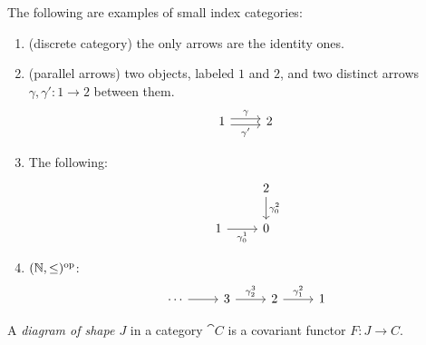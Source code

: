 \documentclass[12pt]{article}
\begin{document}
\begin{example}
	The following are examples of small index categories:
	\begin{enumerate}
		\item (discrete category) the only arrows are the identity ones.
		\item (parallel arrows) two objects, labeled $1$ and $2$, and two distinct arrows $\gamma, \gamma':1\to 2$ between them.
			\begin{equation*}
\begin{tikzcd}
1 \arrow[r, "\gamma", shift left] \arrow[r, "\gamma'"', shift right] & 2
\end{tikzcd}
			\end{equation*}

		\item The following:
			\begin{equation*}
\begin{tikzcd}
                           & 2 \arrow[d, "\gamma^2_0"] \\
1 \arrow[r, "\gamma^1_0"'] & 0                        
\end{tikzcd}
			\end{equation*}

		\item $(\mathbb{N}, \leq)^{\text{op}}$:
			\begin{equation*}
\begin{tikzcd}
\cdots \arrow[r] & 3 \arrow[r, "\gamma^3_2"] & 2 \arrow[r, "\gamma^2_1"] & 1
\end{tikzcd}
			\end{equation*}
	\end{enumerate}
\end{example}

\begin{definition}
	A \emph{diagram of shape $J$} in a category $\cat{C}$ is a covariant functor $F:J\to C$.
\end{definition}
\end{document}
